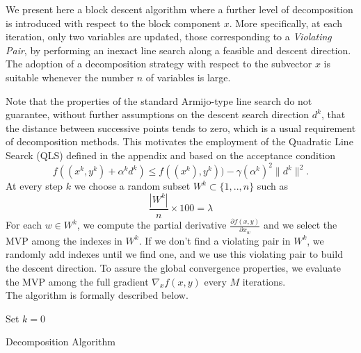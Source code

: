 We present here a block descent algorithm where a further level of decomposition is
introduced with respect to the block component $x$. 
More specifically, at each iteration, only two variables are updated, those corresponding
to a {\it Violating Pair}, by performing an inexact line search along a feasible and descent direction.
The adoption of a decomposition strategy with respect to the subvector $x$ is suitable
whenever the number $n$ of variables is large.

Note that the properties of the standard Armijo-type line search do not guarantee, without further assumptions
on the descent search direction $d^k$, that the distance between successive points tends to zero, which is a usual requirement of decomposition methods. This motivates the employment of the Quadratic Line Searck (QLS) defined in the appendix and based on the acceptance condition
$$
f((x^k,y^k)+\alpha^kd^k)\le f((x^k),y^k))-\gamma (\alpha^k)^2\|d^k\|^2.
$$
At every step $k$ we choose a random subset $W^k\subset \{1,..,n\}$ such as
\begin{equation}\label{eq:lambda}
\frac{|W^k|}{n} \times 100 = \lambda
\end{equation}
For each $w \in W^k$, we compute the partial derivative $\frac{\partial f(x,y)}{\partial x_w}$ and we select the MVP among the indexes in $W^k$. If we don't find a violating pair in $W^k$, we randomly add indexes until we find one, and we use this violating pair to build the descent direction. To assure the global convergence properties, we evaluate the MVP among the full gradient $\nabla_x f(x,y)$ every $M$ iterations. \\
The algorithm is formally described below.

\begin{algorithm}[ht]
 Set $k = 0$\\
 \caption{Decomposition Algorithm}
\end{algorithm}
